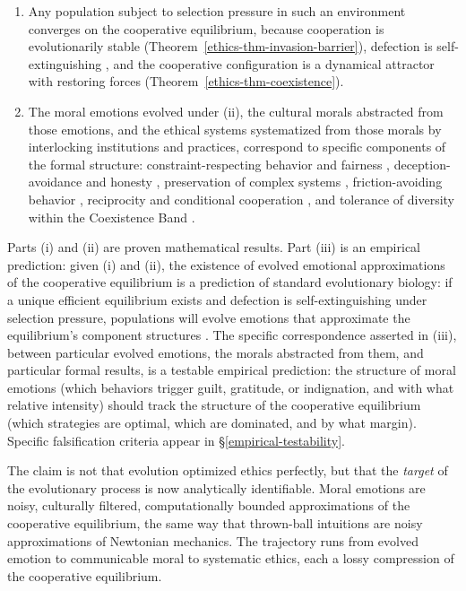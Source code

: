 \documentclass[11pt]{article}
\theoremstyle{plain}
\theoremstyle{definition}
\theoremstyle{remark}
\begin{document}
\begin{enumerate}
\def\labelenumi{(\roman{enumi})}
\setcounter{enumi}{1}
\item
  Any population subject to selection pressure in such an environment
  converges on the cooperative equilibrium, because cooperation is
  evolutionarily stable (Theorem~\ref{ethics-thm-invasion-barrier}),
  defection is self-extinguishing \citep{TC-V}, and the cooperative
  configuration is a dynamical attractor with restoring forces
  (Theorem~\ref{ethics-thm-coexistence}).
\item
  The moral emotions evolved under (ii), the cultural morals abstracted
  from those emotions, and the ethical systems systematized from those
  morals by interlocking institutions and practices, correspond to
  specific components of the formal structure: constraint-respecting
  behavior and fairness \citep{TC-I}, deception-avoidance and honesty
  \citep{TC-II}, preservation of complex systems \citep{TC-III},
  friction-avoiding behavior \citep{TC-IV}, reciprocity and conditional
  cooperation \citep{TC-V}, and tolerance of diversity within the
  Coexistence Band \citep{TC-VI}.
\end{enumerate}

Parts (i) and (ii) are proven mathematical results. Part (iii) is an
empirical prediction: given (i) and (ii), the existence of evolved
emotional approximations of the cooperative equilibrium is a prediction
of standard evolutionary biology: if a unique efficient equilibrium
exists and defection is self-extinguishing under selection pressure,
populations will evolve emotions that approximate the equilibrium's
component structures \citep{Gigerenzer1999, GigerenzerGaissmaier2011}.
The specific correspondence asserted in (iii), between particular
evolved emotions, the morals abstracted from them, and particular formal
results, is a testable empirical prediction: the structure of moral
emotions (which behaviors trigger guilt, gratitude, or indignation, and
with what relative intensity) should track the structure of the
cooperative equilibrium (which strategies are optimal, which are
dominated, and by what margin). Specific falsification criteria appear
in §\ref{empirical-testability}.

The claim is not that evolution optimized ethics perfectly, but that the
\emph{target} of the evolutionary process is now analytically
identifiable. Moral emotions are noisy, culturally filtered,
computationally bounded approximations of the cooperative equilibrium,
the same way that thrown-ball intuitions are noisy approximations of
Newtonian mechanics. The trajectory runs from evolved emotion to
communicable moral to systematic ethics, each a lossy compression of the
cooperative equilibrium.
\end{document}
